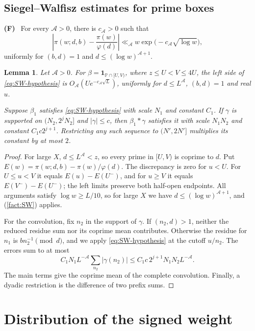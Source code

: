 \documentclass{amsart}
\newtheorem{primeboxlemma}{Lemma}
\newcounter{fact}
\renewcommand{\thefact}{F\arabic{fact}}
\newenvironment{fact}{\refstepcounter{fact}\par\medskip
\noindent\textbf{(\thefact)}\ }{\par\medskip}
\numberwithin{equation}{section}
\numberwithin{table}{section}
\newcommand{\PP}{\mathbb P}
\newcommand{\ind}{\mathbf 1}
\begin{document}
\subsection{Siegel--Walfisz estimates for prime boxes}

\begin{fact}\label{fact:SW}
\cite[Chapter~22]{Da} For every $\mathcal A>0$, there is $c_{\mathcal A}>0$
such that
\[
\left|\pi(w;d,b)-\frac{\pi(w)}{\varphi(d)}\right|
\ll_{\mathcal A}w\exp\big(-c_{\mathcal A}\sqrt{\log w}\big),
\]
uniformly for $(b,d)=1$ and $d\le(\log w)^{\mathcal A+1}$.
\end{fact}

\begin{primeboxlemma}\label{lem:C}
Let $\mathcal A>0$.
For $\beta=\ind_{\PP\cap[U,V)}$, where $z\le U<V\le4U$,
the left side of \eqref{eq:SW-hypothesis} is
$O_{\mathcal A}(Ue^{-c_{\mathcal A}\sqrt L})$,
uniformly for $d\le L^{\mathcal A}$, $(b,d)=1$ and real $u$.

Suppose $\beta_1$ satisfies \eqref{eq:SW-hypothesis} with scale $N_1$
and constant $C_1$.
If $\gamma$ is supported on $(N_2,2^jN_2]$ and $|\gamma|\le c$,
then $\beta_1*\gamma$ satisfies it with scale $N_1N_2$
and constant $C_1c2^{j+1}$.
Restricting any such sequence to $(N',2N']$ multiplies its constant by at most $2$.
\end{primeboxlemma}

\begin{proof}
For large $X$, $d\le L^{\mathcal A}<z$, so every prime in $[U,V)$ is coprime to $d$.
Put $E(w)=\pi(w;d,b)-\pi(w)/\varphi(d)$.
The discrepancy is zero for $u<U$. For $U\le u<V$ it equals
$E(u)-E(U^-)$, and for $u\ge V$ it equals $E(V^-)-E(U^-)$; the left limits preserve
both half-open endpoints. All arguments satisfy $\log w\ge L/10$, so for large $X$ we have
$d\le(\log w)^{\mathcal A+1}$, and (\ref{fact:SW}) applies.

For the convolution, fix $n_2$ in the support of $\gamma$.
If $(n_2,d)>1$, neither the reduced residue sum nor its coprime mean contributes.
Otherwise the residue for $n_1$ is $bn_2^{-1}\pmod d$, and we apply
\eqref{eq:SW-hypothesis} at the cutoff $u/n_2$. The errors sum to at most
\[
C_1N_1L^{-\mathcal A}\sum_{n_2}|\gamma(n_2)|
\le C_1c\,2^{j+1}N_1N_2L^{-\mathcal A}.
\]
The main terms give the coprime mean of the complete convolution.
Finally, a dyadic restriction is the difference of two prefix sums.
\end{proof}

\section{Distribution of the signed weight}\label{sec:BV9}
\end{document}
